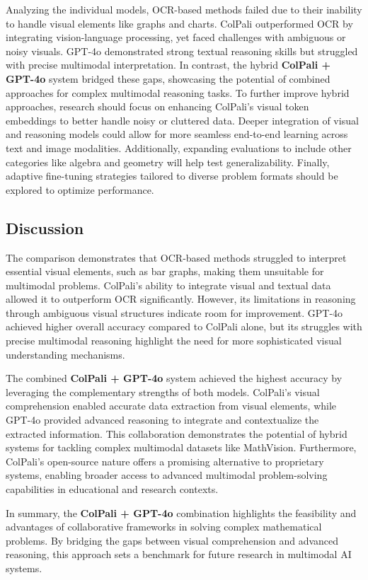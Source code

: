 \documentclass[a4paper,twoside,flushend, 10pt]{article}
\begin{document}
        Analyzing the individual models, OCR-based methods failed due to their inability to handle visual elements like graphs and charts. ColPali outperformed OCR by integrating vision-language processing, yet faced challenges with ambiguous or noisy visuals. GPT-4o demonstrated strong textual reasoning skills but struggled with precise multimodal interpretation. In contrast, the hybrid \textbf{ColPali + GPT-4o} system bridged these gaps, showcasing the potential of combined approaches for complex multimodal reasoning tasks.
To further improve hybrid approaches, research should focus on enhancing ColPali’s visual token embeddings to better handle noisy or cluttered data. Deeper integration of visual and reasoning models could allow for more seamless end-to-end learning across text and image modalities. Additionally, expanding evaluations to include other categories like algebra and geometry will help test generalizability. Finally, adaptive fine-tuning strategies tailored to diverse problem formats should be explored to optimize performance.

\subsection{Discussion}
\noindent
The comparison demonstrates that OCR-based methods struggled to interpret essential visual elements, such as bar graphs, making them unsuitable for multimodal problems. ColPali’s ability to integrate visual and textual data allowed it to outperform OCR significantly. However, its limitations in reasoning through ambiguous visual structures indicate room for improvement. GPT-4o achieved higher overall accuracy compared to ColPali alone, but its struggles with precise multimodal reasoning highlight the need for more sophisticated visual understanding mechanisms. 

The combined \textbf{ColPali + GPT-4o} system achieved the highest accuracy by leveraging the complementary strengths of both models. ColPali’s visual comprehension enabled accurate data extraction from visual elements, while GPT-4o provided advanced reasoning to integrate and contextualize the extracted information. This collaboration demonstrates the potential of hybrid systems for tackling complex multimodal datasets like MathVision. Furthermore, ColPali’s open-source nature offers a promising alternative to proprietary systems, enabling broader access to advanced multimodal problem-solving capabilities in educational and research contexts.

In summary, the \textbf{ColPali + GPT-4o} combination highlights the feasibility and advantages of collaborative frameworks in solving complex mathematical problems. By bridging the gaps between visual comprehension and advanced reasoning, this approach sets a benchmark for future research in multimodal AI systems.
\end{document}
